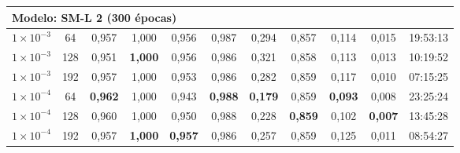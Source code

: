\begin{longtable}{cc ccccccccc}
\multicolumn{11}{l}{\textbf{Modelo: SM-L 2 (300 épocas)}} \\
\midrule
$1 \times 10^{-3}$ & 64  & 0,957 & 1,000 & 0,956 & 0,987 & 0,294 & 0,857 & 0,114 & 0,015 & 19:53:13 \\
$1 \times 10^{-3}$ & 128 & 0,951 & \textbf{1,000} & 0,956 & 0,986 & 0,321 & 0,858 & 0,113 & 0,013 & 10:19:52 \\
$1 \times 10^{-3}$ & 192 & 0,957 & 1,000 & 0,953 & 0,986 & 0,282 & 0,859 & 0,117 & 0,010 & 07:15:25 \\
$1 \times 10^{-4}$ & 64  & \textbf{0,962} & 1,000 & 0,943 & \textbf{0,988} & \textbf{0,179} & 0,859 & \textbf{0,093} & 0,008 & 23:25:24 \\
$1 \times 10^{-4}$ & 128 & 0,960 & 1,000 & 0,950 & 0,988 & 0,228 & \textbf{0,859} & 0,102 & \textbf{0,007} & 13:45:28 \\
$1 \times 10^{-4}$ & 192 & 0,957 & \textbf{1,000} & \textbf{0,957} & 0,986 & 0,257 & 0,859 & 0,125 & 0,011 & 08:54:27 \\
\end{longtable}
